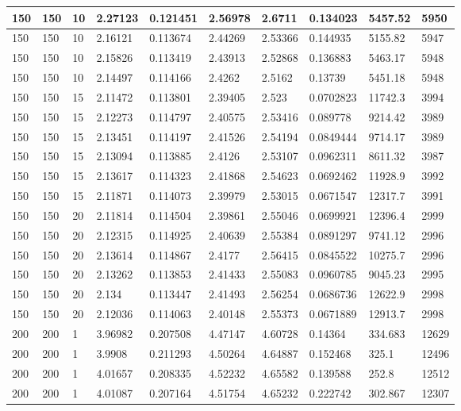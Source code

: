 \begin{landscape}
\begin{longtable}{ | l | l | l | l | l | l | l | l | l | l | }
150 & 150 & 10 & 2.27123 & 0.121451 & 2.56978 & 2.6711 & 0.134023 & 5457.52 & 5950\\ \hline
150 & 150 & 10 & 2.16121 & 0.113674 & 2.44269 & 2.53366 & 0.144935 & 5155.82 & 5947\\ \hline
150 & 150 & 10 & 2.15826 & 0.113419 & 2.43913 & 2.52868 & 0.136883 & 5463.17 & 5948\\ \hline
150 & 150 & 10 & 2.14497 & 0.114166 & 2.4262 & 2.5162 & 0.13739 & 5451.18 & 5948\\ \hline
150 & 150 & 15 & 2.11472 & 0.113801 & 2.39405 & 2.523 & 0.0702823 & 11742.3 & 3994\\ \hline
150 & 150 & 15 & 2.12273 & 0.114797 & 2.40575 & 2.53416 & 0.089778 & 9214.42 & 3989\\ \hline
150 & 150 & 15 & 2.13451 & 0.114197 & 2.41526 & 2.54194 & 0.0849444 & 9714.17 & 3989\\ \hline
150 & 150 & 15 & 2.13094 & 0.113885 & 2.4126 & 2.53107 & 0.0962311 & 8611.32 & 3987\\ \hline
150 & 150 & 15 & 2.13617 & 0.114323 & 2.41868 & 2.54623 & 0.0692462 & 11928.9 & 3992\\ \hline
150 & 150 & 15 & 2.11871 & 0.114073 & 2.39979 & 2.53015 & 0.0671547 & 12317.7 & 3991\\ \hline
150 & 150 & 20 & 2.11814 & 0.114504 & 2.39861 & 2.55046 & 0.0699921 & 12396.4 & 2999\\ \hline
150 & 150 & 20 & 2.12315 & 0.114925 & 2.40639 & 2.55384 & 0.0891297 & 9741.12 & 2996\\ \hline
150 & 150 & 20 & 2.13614 & 0.114867 & 2.4177 & 2.56415 & 0.0845522 & 10275.7 & 2996\\ \hline
150 & 150 & 20 & 2.13262 & 0.113853 & 2.41433 & 2.55083 & 0.0960785 & 9045.23 & 2995\\ \hline
150 & 150 & 20 & 2.134 & 0.113447 & 2.41493 & 2.56254 & 0.0686736 & 12622.9 & 2998\\ \hline
150 & 150 & 20 & 2.12036 & 0.114063 & 2.40148 & 2.55373 & 0.0671889 & 12913.7 & 2998\\ \hline
200 & 200 & 1 & 3.96982 & 0.207508 & 4.47147 & 4.60728 & 0.14364 & 334.683 & 12629\\ \hline
200 & 200 & 1 & 3.9908 & 0.211293 & 4.50264 & 4.64887 & 0.152468 & 325.1 & 12496\\ \hline
200 & 200 & 1 & 4.01657 & 0.208335 & 4.52232 & 4.65582 & 0.139588 & 252.8 & 12512\\ \hline
200 & 200 & 1 & 4.01087 & 0.207164 & 4.51754 & 4.65232 & 0.222742 & 302.867 & 12307\\ \hline

\end{longtable}
\end{landscape}
